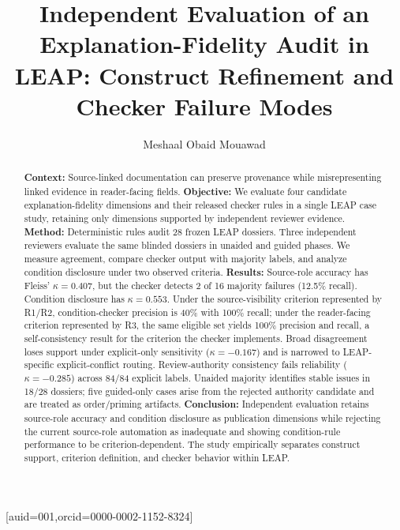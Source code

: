 \documentclass[a4paper,fleqn]{cas-dc}
\begin{document}
\let\WriteBookmarks\relax
\def\floatpagepagefraction{1}
\def\textpagefraction{.001}


\title[mode=title]{Independent Evaluation of an Explanation-Fidelity Audit in LEAP: Construct Refinement and Checker Failure Modes}

\author[1]{Meshaal Obaid Mouawad}[auid=001,orcid=0000-0002-1152-8324]
\cormark[1]

\begin{abstract}
\textbf{Context:} Source-linked documentation can preserve provenance while misrepresenting linked evidence in reader-facing fields.
\textbf{Objective:} We evaluate four candidate explanation-fidelity dimensions and their released checker rules in a single LEAP case study, retaining only dimensions supported by independent reviewer evidence.
\textbf{Method:} Deterministic rules audit 28 frozen LEAP dossiers. Three independent reviewers evaluate the same blinded dossiers in unaided and guided phases. We measure agreement, compare checker output with majority labels, and analyze condition disclosure under two observed criteria.
\textbf{Results:} Source-role accuracy has Fleiss' $\kappa=0.407$, but the checker detects 2 of 16 majority failures (12.5\% recall). Condition disclosure has $\kappa=0.553$. Under the source-visibility criterion represented by R1/R2, condition-checker precision is 40\% with 100\% recall; under the reader-facing criterion represented by R3, the same eligible set yields 100\% precision and recall, a self-consistency result for the criterion the checker implements. Broad disagreement loses support under explicit-only sensitivity ($\kappa=-0.167$) and is narrowed to LEAP-specific explicit-conflict routing. Review-authority consistency fails reliability ($\kappa=-0.285$) across 84/84 explicit labels. Unaided majority identifies stable issues in 18/28 dossiers; five guided-only cases arise from the rejected authority candidate and are treated as order/priming artifacts.
\textbf{Conclusion:} Independent evaluation retains source-role accuracy and condition disclosure as publication dimensions while rejecting the current source-role automation as inadequate and showing condition-rule performance to be criterion-dependent. The study empirically separates construct support, criterion definition, and checker behavior within LEAP.
\end{abstract}
\end{document}
